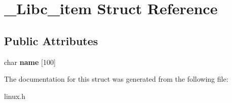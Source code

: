 \hypertarget{struct__Libc__item}{\section{\-\_\-\-Libc\-\_\-item \-Struct \-Reference}
\label{struct__Libc__item}
}
\subsection*{\-Public \-Attributes}
\begin{DoxyCompactItemize}
\item 
\hypertarget{struct__Libc__item_a9e2b9dc3ffd27e49de8fd8217d8e2d08}{char {\bfseries name} \mbox{[}100\mbox{]}}\label{struct__Libc__item_a9e2b9dc3ffd27e49de8fd8217d8e2d08}

\end{DoxyCompactItemize}


\-The documentation for this struct was generated from the following file\-:\begin{DoxyCompactItemize}
\item 
linux.\-h\end{DoxyCompactItemize}

